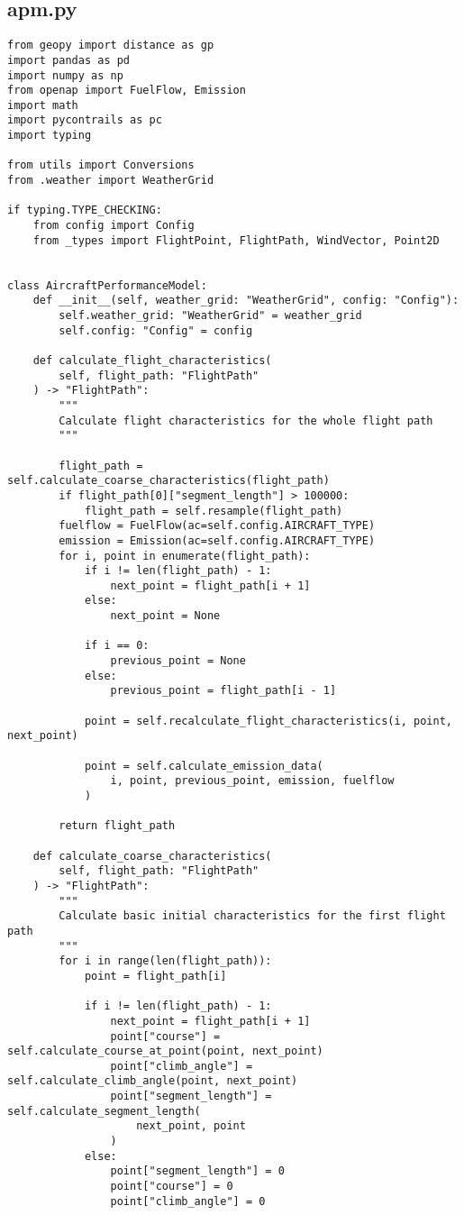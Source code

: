 \subsection{apm.py}
\begin{verbatim}
from geopy import distance as gp
import pandas as pd
import numpy as np
from openap import FuelFlow, Emission
import math
import pycontrails as pc
import typing

from utils import Conversions
from .weather import WeatherGrid

if typing.TYPE_CHECKING:
    from config import Config
    from _types import FlightPoint, FlightPath, WindVector, Point2D


class AircraftPerformanceModel:
    def __init__(self, weather_grid: "WeatherGrid", config: "Config"):
        self.weather_grid: "WeatherGrid" = weather_grid
        self.config: "Config" = config

    def calculate_flight_characteristics(
        self, flight_path: "FlightPath"
    ) -> "FlightPath":
        """
        Calculate flight characteristics for the whole flight path
        """

        flight_path = self.calculate_coarse_characteristics(flight_path)
        if flight_path[0]["segment_length"] > 100000:
            flight_path = self.resample(flight_path)
        fuelflow = FuelFlow(ac=self.config.AIRCRAFT_TYPE)
        emission = Emission(ac=self.config.AIRCRAFT_TYPE)
        for i, point in enumerate(flight_path):
            if i != len(flight_path) - 1:
                next_point = flight_path[i + 1]
            else:
                next_point = None

            if i == 0:
                previous_point = None
            else:
                previous_point = flight_path[i - 1]

            point = self.recalculate_flight_characteristics(i, point, next_point)

            point = self.calculate_emission_data(
                i, point, previous_point, emission, fuelflow
            )

        return flight_path

    def calculate_coarse_characteristics(
        self, flight_path: "FlightPath"
    ) -> "FlightPath":
        """
        Calculate basic initial characteristics for the first flight path
        """
        for i in range(len(flight_path)):
            point = flight_path[i]

            if i != len(flight_path) - 1:
                next_point = flight_path[i + 1]
                point["course"] = self.calculate_course_at_point(point, next_point)
                point["climb_angle"] = self.calculate_climb_angle(point, next_point)
                point["segment_length"] = self.calculate_segment_length(
                    next_point, point
                )
            else:
                point["segment_length"] = 0
                point["course"] = 0
                point["climb_angle"] = 0


\end{verbatim}
